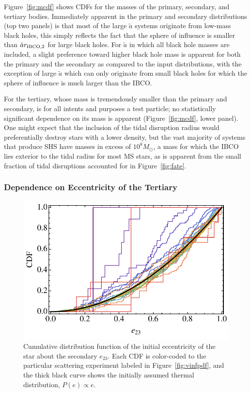 \documentclass[a4paper,twocolumn]{emulateapj}
\begin{document}
{Figure~\ref{fig:mcdf} shows CDFs for the masses of the primary, secondary, and tertiary bodies. Immediately apparent in the primary and secondary distributions (top two panels) is that most of the large $\tilde{a}$ systems originate from low-mass black holes, this simply reflects the fact that the sphere of influence is smaller than $\tilde{a} r_{\rm IBCO, 2}$ for large black holes. For $\tilde{a}$ in which all black hole masses are included, a slight preference toward higher black hole mass is apparent for both the primary and the secondary as compared to the input distributions, with the exception of large $\tilde{a}$ which can only originate from small black holes for which the sphere of influence is much larger than the IBCO.

For the tertiary, whose mass is tremendously smaller than the primary and secondary, is for all intents and purposes a test particle; no statistically significant dependence on its mass is apparent (Figure~\ref{fig:mcdf}, lower panel). One might expect that the inclusion of the tidal disruption radius would preferentially destroy stars with a lower density, but the vast majority of systems that produce SHS have masses in excess of $10^{8} M_{\odot}$, a mass for which the IBCO lies exterior to the tidal radius for most MS stars, as is apparent from the small fraction of tidal disruptions accounted for in Figure~\ref{fig:fate}.

\subsubsection{Dependence on Eccentricity of the Tertiary}

\begin{figure}
\centering\includegraphics[width=0.9\linewidth,clip=true]{eCDF}
\caption{Cumulative distribution function of the initial eccentricity of the star about the secondary $e_{23}$. Each CDF is color-coded to the particular scattering experiment labeled in Figure~\ref{fig:vinfpdf}, and the thick black curve shows the initially assumed thermal distribution, $P(e) \propto e$.}
\label{fig:ecdf}
\end{figure}

}
\end{document}
